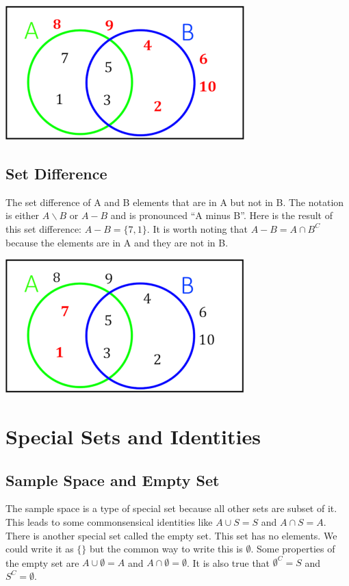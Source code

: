 \documentclass[
]{book}
\begin{document}
\includegraphics{Pictures/01-Sets/AC.PNG}

\hypertarget{set-difference}{%
\subsection{Set Difference}\label{set-difference}}

The set difference of A and B elements that are in A but not in B. The notation is either \(A \backslash B\) or \(A - B\) and is pronounced ``A minus B''. Here is the result of this set difference: \(A - B = \{7,1\}\). It is worth noting that \(A-B=A \cap B^C\) because the elements are in A and they are not in B.

\includegraphics{Pictures/01-Sets/A-B.PNG}

\hypertarget{special-sets-and-identities}{%
\section{Special Sets and Identities}\label{special-sets-and-identities}}

\hypertarget{sample-space-and-empty-set}{%
\subsection{Sample Space and Empty Set}\label{sample-space-and-empty-set}}

The sample space is a type of special set because all other sets are subset of it. This leads to some commonsensical identities like \(A \cup S = S\) and \(A \cap S = A\). There is another special set called the empty set. This set has no elements. We could write it as \(\{\}\) but the common way to write this is \(\emptyset\). Some properties of the empty set are \(A \cup \emptyset = A\) and \(A \cap \emptyset = \emptyset\). It is also true that \(\emptyset^C = S\) and \(S^C = \emptyset\).
\end{document}
